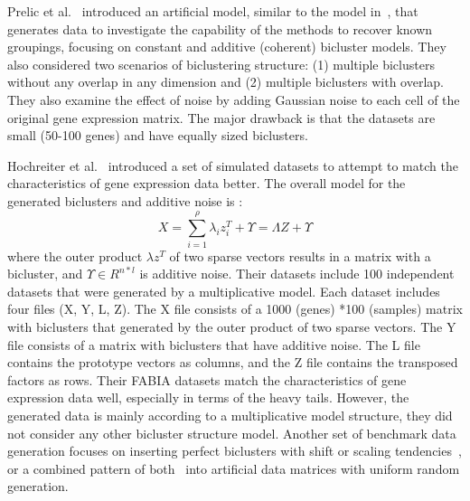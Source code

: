 Prelic et al.~\cite{prelic2006systematic} introduced an artificial model, similar to the model in~\cite{ihmels2002revealing}, that generates data to investigate the capability of the methods to recover known groupings, focusing on constant and additive (coherent) bicluster models.
They also considered two scenarios of biclustering structure: (1) multiple biclusters without any overlap in any dimension and (2) multiple biclusters with overlap.
They also examine the effect of noise by adding Gaussian noise to each cell of the original gene expression matrix.
The major drawback is that the datasets are small (50-100 genes) and have equally sized biclusters.

Hochreiter et al.~\cite{hochreiter2010fabia} introduced a set of simulated datasets to attempt to match the characteristics of gene expression data better. The overall model for the generated  biclusters and additive noise is :
\begin{equation}
	X =  \sum_{i=1}^{\rho }\lambda_{i} z_{i}^{T} +\Upsilon  =\Lambda Z +\Upsilon 
\end{equation}
where the outer product $\lambda z_{}^{T}$ of two sparse vectors results in a matrix with a bicluster, and $\Upsilon \in R^{n*l}$ is additive noise. Their datasets include 100 independent datasets that were generated by a multiplicative model. Each dataset includes four files (X, Y, L, Z). The X file consists of a 1000 (genes) *100 (samples) matrix with biclusters that generated by the outer product of two sparse vectors. The Y file consists of a matrix with biclusters that have additive noise. The L file contains the prototype vectors as columns, and the Z file contains the transposed factors as rows. Their FABIA datasets match the characteristics of gene expression data well, especially in terms of the heavy tails. However, the generated data is mainly according to a multiplicative model structure, they did not consider any other bicluster structure model. %
Another set of benchmark data generation focuses on inserting perfect biclusters with shift or scaling tendencies~\cite{mukhopadhyay2010biclustering}, or a combined pattern of both~\cite{pontes2013configurable} into artificial data matrices with uniform random generation.


